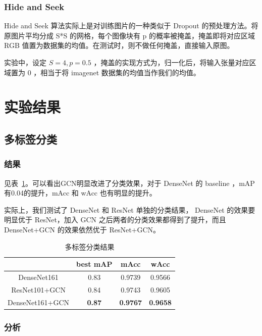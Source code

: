 \documentclass[a4paper]{ctexart}
\begin{document}
\subsubsection{Hide and Seek}
Hide and Seek 算法实际上是对训练图片的一种类似于 Dropout 的预处理方法。将原图片平均分成 S*S 的网格，每个图像块有 p 的概率被掩盖，掩盖即将对应区域 RGB 值置为数据集的均值。在测试时，则不做任何掩盖，直接输入原图。

实验中，设定 $S=4, p=0.5$ ，掩盖的实现方式为，归一化后，将输入张量对应区域置为 0 ，相当于将 imagenet 数据集的均值当作我们的均值。

\section{实验结果}

\subsection{多标签分类}
\subsubsection{结果}

见表~\ref{table:Multi Label Classification}。可以看出GCN明显改进了分类效果，对于 DenseNet 的 baseline ，mAP 有0.04的提升，mAcc 和 wAcc 也有明显的提升。

实际上，我们测试了 DenseNet 和 ResNet 单独的分类结果， DenseNet 的效果要明显优于 ResNet，加入 GCN 之后两者的分类效果都得到了提升，而且 DenseNet+GCN 的效果依然优于 ResNet+GCN。

\begin{table}[t]
\centering
\caption{多标签分类结果}
\label{table:Multi Label Classification}
\begin{tabular}{c|ccc}
\hline
\hline
 & best mAP & mAcc & wAcc \\
\hline
DenseNet161 & 0.83 & 0.9739 & 0.9566 \\
ResNet101+GCN & 0.84 & 0.9743 & 0.9605 \\
DenseNet161+GCN & \textbf{0.87} & \textbf{0.9767} & \textbf{0.9658} \\
\hline
\hline
\end{tabular}
\end{table}

\subsubsection{分析}
\end{document}
